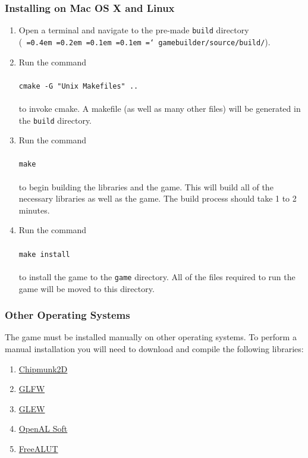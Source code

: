 \documentclass[12pt, titlepage]{article}
\newcommand*\justify{%
  \fontdimen2\font=0.4em%
  \fontdimen3\font=0.2em%
  \fontdimen4\font=0.1em%
  \fontdimen7\font=0.1em%
  \hyphenchar\font=`\-%
}
\begin{document}
\subsubsection{Installing on Mac OS X and Linux}


\begin{enumerate}
  \item Open a terminal and navigate to the pre-made \texttt{build} directory\\ (\texttt{\justify gamebuilder/source/build/}).
  \item Run the command\\\\
   ${}$\qquad \texttt{cmake -G "Unix Makefiles" ..}\\\\
    to invoke cmake.  A makefile (as well as many other files) will be generated in the \texttt{build} directory.

  \item Run the command\\\\
   ${}$\qquad \texttt{make}\\\\
    to begin building the libraries and the game.  This will build all of the necessary libraries as well as the game.  The build process should take 1 to 2 minutes.
\newpage
  \item Run the command\\\\
  ${}$\qquad \texttt{make install}\\\\
  to install the game to the \texttt{game} directory.  All of the files required to run the game will be moved to this directory.
\end{enumerate}

\subsubsection{Other Operating Systems}
The game must be installed manually on other operating systems.  To perform a manual installation you will need to download and compile the following libraries:

\begin{enumerate}
  \item \href{https://chipmunk-physics.net/}{Chipmunk2D}
  \item \href{http://www.glfw.org/}{GLFW}
  \item \href{http://www.glew.org/}{GLEW}
  \item \href{http://kcat.strangesoft.net/openal.html}{OpenAL Soft}
  \item \href{https://github.com/vancegroup/freealut}{FreeALUT}
\end{enumerate}
\end{document}
